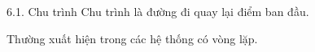 \documentclass{beamer}
\begin{document}
\begin{frame}{6.1. Chu trình}
\Large
Chu trình là đường đi quay lại điểm ban đầu.

\vspace{0.3cm}
Thường xuất hiện trong các hệ thống có vòng lặp.
\end{frame}
\end{document}

